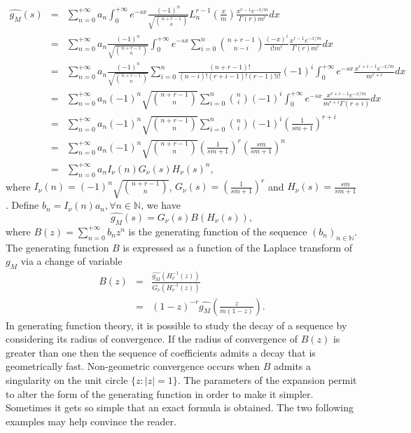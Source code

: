 \begin{eqnarray}
\widehat{g_{M}}(s)&=&\sum_{n=0}^{+\infty}a_{n} \int_{0}^{+\infty}e^{-sx}\frac{(-1)^{n}}{\sqrt{\binom{n+r-1}{n}}}L^{r-1}_{n}\left(\frac{x}{m}\right)\frac{x^{r-1}e^{-x/m}}{\Gamma(r)m^{r}}dx\nonumber\\
&=&\sum_{n=0}^{+\infty}a_{n}\frac{(-1)^{n}}{\sqrt{\binom{n+r-1}{n}}}\int^{+\infty}_{0}e^{-sx}\sum_{i=0}^{n}\binom{n+r-1}{n-i}\frac{(-x)^{i}}{i!m^{r}}\frac{x^{r-1}e^{-x/m}}{\Gamma(r)m^{r}}dx\nonumber\\
&=&\sum_{n=0}^{+\infty}a_{n}\frac{(-1)^{n}}{\sqrt{\binom{n+r-1}{n}}}\sum_{i=0}^{n}\frac{(n+r-1)!}{(n-i)!(r+i-1)!(r-1)!i!}(-1)^{i}\int^{+\infty}_{0}e^{-sx}\frac{x^{r+i-1}e^{-x/m}}{m^{r+i}}dx\nonumber\\
&=&\sum_{n=0}^{+\infty}a_{n}(-1)^{n}\sqrt{\binom{n+r-1}{n}}\sum_{i=0}^{n}\binom{n}{i}(-1)^{i}\int^{+\infty}_{0}e^{-sx}\frac{x^{r+i-1}e^{-x/m}}{m^{r+i}\Gamma(r+i)}dx\nonumber\\
&=&\sum_{n=0}^{+\infty}a_{n}(-1)^{n}\sqrt{\binom{n+r-1}{n}}\sum_{i=0}^{n}\binom{n}{i}(-1)^{i}\left(\frac{1}{sm+1}\right)^{r+i}\nonumber\\
&=&\sum_{n=0}^{+\infty}a_{n}(-1)^{n}\sqrt{\binom{n+r-1}{n}}\left(\frac{1}{sm+1}\right)^{r}\left(\frac{sm}{sm+1}\right)^{n}\nonumber\\
&=&\sum_{n=0}^{+\infty}a_{n}I_{\nu}(n)G_{\nu}(s)H_{\nu}(s)^{n}\nonumber,
\end{eqnarray}
where $I_{\nu}(n)=(-1)^{n}\sqrt{\binom{n+r-1}{n}}$, $G_{\nu}(s)=\left(\frac{1}{sm+1}\right)^{r}$ and $H_{\nu}(s)=\frac{sm}{sm+1}$. Define $b_{n}=I_{\nu}(n)a_{n}, \forall n\in \mathbb{N}$, we have
\begin{equation}
\widehat{g_{M}}(s)=G_{\nu}(s)B(H_{\nu}(s))\label{GeneratingFunctionToLaplaceTransform},
\end{equation}
where $B(z)=\sum^{+\infty}_{n=0}b_{n}z^{n}$ is the generating function of the sequence $(b_{n})_{n\in\mathbb{N}}$. The generating function $B$ is expressed as a function of the Laplace transform of $g_{M}$ via a change of variable
\begin{eqnarray}
B(z)&=&\frac{\widehat{g_{M}}(H^{-1}_{\nu}(z))}{G_{\nu}(H^{-1}_{\nu}(z))}\nonumber\\
&=&(1-z)^{-r}\widehat{g_{M}}\left(\frac{z}{m(1-z)}\right).\label{LaplaceTransformToGeneratingFunction}
\end{eqnarray}  
In generating function theory, it is possible to study the decay of a sequence by considering its radius of convergence. If the radius of convergence of $B(z)$ is greater than one then the sequence of coefficients admits a decay that is geometrically fast. Non-geometric convergence occurs when $B$ admits a singularity on the unit circle $\{z:|z|=1\}$. The parameters of the expansion permit to alter the form of the generating function in order to make it simpler. Sometimes it gets so simple that an exact formula is obtained. The two following examples may help convince the reader. 
